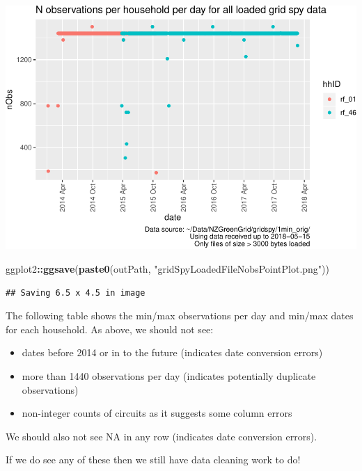 \documentclass[]{article}
\newenvironment{Shaded}{\begin{snugshade}}{\end{snugshade}}
\newcommand{\KeywordTok}[1]{\textcolor[rgb]{0.13,0.29,0.53}{\textbf{#1}}}
\newcommand{\StringTok}[1]{\textcolor[rgb]{0.31,0.60,0.02}{#1}}
\newcommand{\OperatorTok}[1]{\textcolor[rgb]{0.81,0.36,0.00}{\textbf{#1}}}
\newcommand{\NormalTok}[1]{#1}
\providecommand{\tightlist}{%
  \setlength{\itemsep}{0pt}\setlength{\parskip}{0pt}}
\begin{document}
\includegraphics{processNZGGElecCons1minData_v2_files/figure-latex/loadedFilesObsPlots-2.pdf}

\begin{Shaded}
\begin{Highlighting}[]
\NormalTok{ggplot2}\OperatorTok{::}\KeywordTok{ggsave}\NormalTok{(}\KeywordTok{paste0}\NormalTok{(outPath, }\StringTok{"gridSpyLoadedFileNobsPointPlot.png"}\NormalTok{))}
\end{Highlighting}
\end{Shaded}

\begin{verbatim}
## Saving 6.5 x 4.5 in image
\end{verbatim}

The following table shows the min/max observations per day and min/max
dates for each household. As above, we should not see:

\begin{itemize}
\tightlist
\item
  dates before 2014 or in to the future (indicates date conversion
  errors)
\item
  more than 1440 observations per day (indicates potentially duplicate
  observations)
\item
  non-integer counts of circuits as it suggests some column errors
\end{itemize}

We should also not see NA in any row (indicates date conversion errors).

If we do see any of these then we still have data cleaning work to do!
\end{document}
